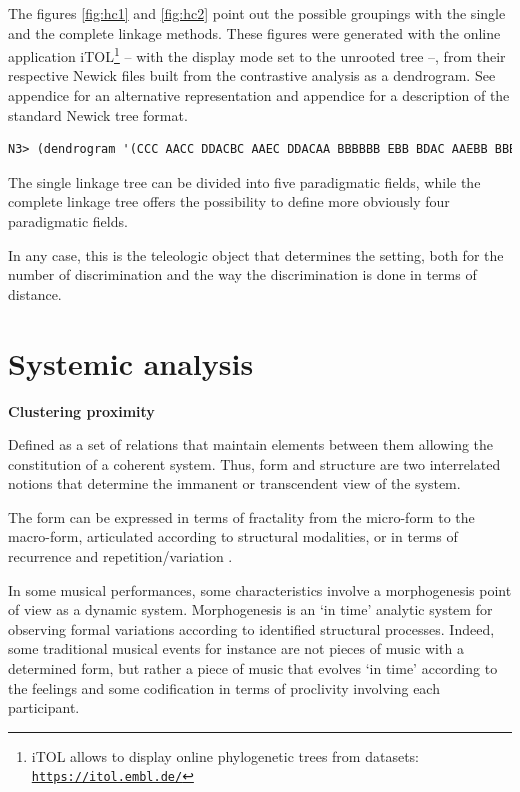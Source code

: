The figures \ref{fig:hc1} and \ref{fig:hc2} point out the possible groupings with the single and the complete linkage methods. These figures were generated with the online application iTOL\footnote{iTOL allows to display online phylogenetic trees from datasets:\\ \indent \href{https://itol.embl.de/}{\scriptsize{\texttt{https://itol.embl.de/}}}} -- with the display mode set to the unrooted tree --,
from their respective Newick files built from the contrastive analysis as a dendrogram. See appendice  for an alternative representation and appendice  for a description of the standard Newick tree format.

\smallskip
 
\begin{lstlisting}[language=Lisp]
N3> (dendrogram '(CCC AACC DDACBC AAEC DDACAA BBBBBB EBB BDAC AAEBB BBB EE BBBBACDEAAEAA CBB BBEAA AABBAD ABCC ACEC DDACDBAE CDAA ABBEAAEBAD AE DEAA EAD DC CBE ABBC EBD ABDAA EBAA ABBEAABC DBB) 1|2)     
\end{lstlisting}

The single linkage tree can be divided into five paradigmatic fields, while the complete linkage tree offers the possibility to define more obviously four paradigmatic fields. 

In any case, this is the teleologic object that determines the setting, both for the number of discrimination and the way the discrimination is done in terms of distance.

\section{Systemic analysis}

\textbf{Clustering proximity}
\smallskip

Defined as a set of relations that maintain elements between them allowing the constitution of a coherent system. Thus, form and structure are two interrelated notions that determine the immanent or transcendent view of the system.

\smallskip

The form can be expressed in terms of fractality from the micro-form to the macro-form, articulated according to structural modalities, or in terms of recurrence and repetition/variation  \citep{afum}.

In some musical performances, some characteristics involve a morphogenesis point of view as a dynamic system. Morphogenesis is an `in time' analytic system for observing formal variations according to identified structural processes. Indeed, some traditional musical events for instance are not pieces of music with a determined form, but rather a piece of music that evolves `in time' according to the feelings and some codification in terms of proclivity involving each participant.

